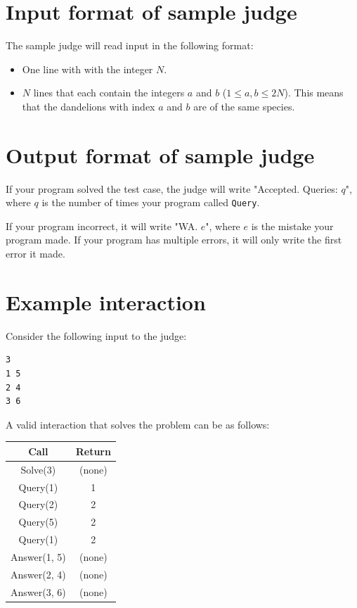 \section*{Input format of sample judge}
The sample judge will read input in the following format:
\begin{itemize}
  \item One line with with the integer $N$.
  \item $N$ lines that each contain the integers $a$ and $b$ ($1 \leq a,b \leq 2N$). This means that the dandelions with
  index $a$ and $b$ are of the same species. 
\end{itemize}

\section*{Output format of sample judge}
If your program solved the test case, the judge will write "Accepted. Queries: $q$", where $q$ is the number
of times your program called \texttt{Query}.

If your program incorrect, it will write "WA. $e$", where $e$ is the mistake your program made. If your program has
multiple errors, it will only write the first error it made.


\section*{Example interaction}

Consider the following input to the judge:
\begin{verbatim}
3
1 5
2 4
3 6
\end{verbatim}

A valid interaction that solves the problem can be as follows:

\begin{table}[htbp]
  \centering
  \begin{tabular}{|c|c|}
      \hline
      \textbf{Call} & \textbf{Return} \\
      \hline
      Solve(3) & (none) \\
      \hline
      Query(1) & 1 \\
      \hline
      Query(2) & 2 \\
      \hline
      Query(5) & 2 \\
      \hline
      Query(1) & 2 \\
      \hline
      Answer(1, 5) & (none) \\
      \hline
      Answer(2, 4) & (none) \\
      \hline
      Answer(3, 6) & (none) \\
      \hline
  \end{tabular}
\end{table}


